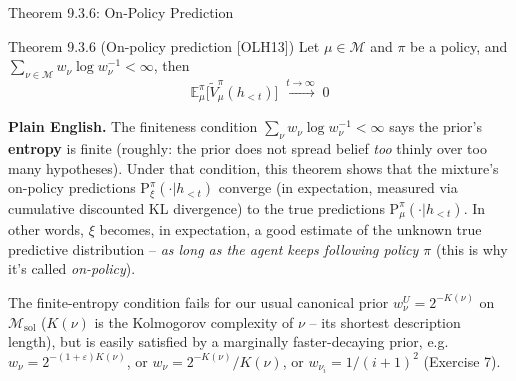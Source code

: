 \documentclass[aspectratio=169,10pt]{beamer}
\newcommand{\E}{\mathbb{E}}
\begin{document}
\begin{frame}{Theorem 9.3.6: On-Policy Prediction}
  \begin{block}{Theorem 9.3.6 (On-policy prediction [OLH13])}
    Let $\mu\in\mathcal{M}$ and $\pi$ be a policy, and
    $\sum_{\nu\in\mathcal{M}} w_\nu\log w_\nu^{-1}<\infty$, then
    \[
      \E^\pi_\mu\big[\tilde V^\pi_\mu(h_{<t})\big] \;\xrightarrow{t\to\infty}\; 0
    \]
  \end{block}
  \textbf{Plain English.} The finiteness condition
  $\sum_\nu w_\nu\log w_\nu^{-1}<\infty$ says the prior's \textbf{entropy}
  is finite (roughly: the prior does not spread belief \emph{too} thinly
  over too many hypotheses). Under that condition, this theorem shows that
  the mixture's on-policy predictions $\mathrm{P}^\pi_\xi(\cdot|h_{<t})$
  converge (in expectation, measured via cumulative discounted KL
  divergence) to the true predictions $\mathrm{P}^\pi_\mu(\cdot|h_{<t})$.
  In other words, $\xi$ becomes, in expectation, a good estimate of the
  unknown true predictive distribution -- \emph{as long as the agent keeps
  following policy $\pi$} (this is why it's called \emph{on-policy}).

  \vspace{0.3em}
  The finite-entropy condition fails for our usual canonical prior
  $w_\nu^U = 2^{-K(\nu)}$ on $\mathcal{M}_{\mathrm{sol}}$ ($K(\nu)$ is the
  Kolmogorov complexity of $\nu$ -- its shortest description length), but
  is easily satisfied by a marginally faster-decaying prior, e.g.\
  $w_\nu = 2^{-(1+\varepsilon)K(\nu)}$, or $w_\nu = 2^{-K(\nu)}/K(\nu)$, or
  $w_{\nu_i}=1/(i+1)^2$ (Exercise 7).
\end{frame}
\end{document}
